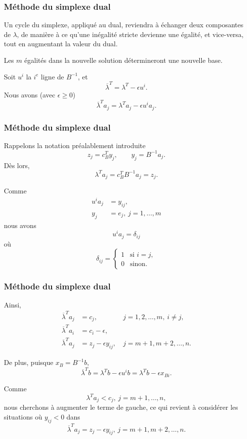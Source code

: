 \documentclass[usepdftitle=false]{beamer}
\begin{document}
\begin{frame}
	\frametitle{Méthode du simplexe dual}
	
	Un cycle du simplexe, appliqué au dual, reviendra à échanger deux composantes de $\lambda$, de manière à ce qu'une inégalité stricte devienne une égalité, et vice-versa, tout en augmentant la valeur du dual.
	
	\mbox{}
	
	Les $m$ égalités dans la nouvelle solution détermineront une nouvelle base.
	
	\mbox{}
	
	Soit $u^i$ la $i^e$ ligne de $B^{-1}$, et
	\[
	\overline{\lambda}^T = \lambda^T - \epsilon u^i.
	\]
	Nous avons (avec $\epsilon \geq 0$)
	\[
	\overline{\lambda}^T a_j = \lambda^T a_j - \epsilon u^i a_j.
	\]
	
\end{frame}

\begin{frame}
	\frametitle{Méthode du simplexe dual}
	
	Rappelons la notation préalablement introduite
	\[
	z_j = c_B^T y_j,\qquad y_j = B^{-1}a_j.
	\]
	Dès lors,
	\[
	\lambda^T a_j = c_B^T B^{-1} a_j = z_j.
	\]
	
	\mbox{}
	
	Comme
	\begin{align*}
		u^i a_j &= y_{ij},\\
		y_j &= e_j,\ j = 1,\ldots,m
	\end{align*}
	nous avons
	\[
	u^i a_j = \delta_{ij}
	\]
	où
	\[
	\delta_{ij} =
	\begin{cases}
		1 & \mbox{si } i = j,\\
		0 & \mbox{sinon}.
	\end{cases}
	\]
	
\end{frame}

\begin{frame}
	\frametitle{Méthode du simplexe dual}
	
	Ainsi,
	\begin{align*}
		\overline{\lambda}^T a_j &= c_j, &\ j = 1,2,\ldots, m,\ i \ne j, \\
		\overline{\lambda}^T a_i &= c_i - \epsilon, \\
		\overline{\lambda}^T a_j &= z_j - \epsilon y_{ij}, &\ j = m+1,m+2,\ldots, n.
	\end{align*}
	
	De plus, puisque $x_B = B^{-1}b$,
	\[
	\overline{\lambda}^T b = 
	\lambda^T b - \epsilon u^i b = 
	\lambda^T b - \epsilon x_{Bi}.
	\]
	
	\mbox{}
	
	Comme
	\[
	\lambda^T a_j < c_j,\ j = m+1, \ldots, n,
	\]
	nous cherchons à augmenter le terme de gauche, ce qui revient à considérer les situations où $y_{ij} < 0$ dans
	\[
	\overline{\lambda}^T a_j = z_j - \epsilon y_{ij}, \ j = m+1,m+2,\ldots, n.
	\]
	
\end{frame}
\end{document}
